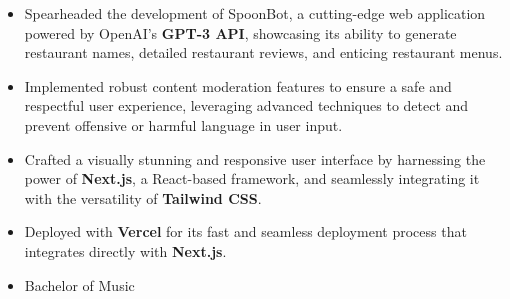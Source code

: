 \documentclass[9pt,a4paper,withhyper]{altacv}
\begin{document}
\begin{paracol}{2}
  \begin{itemize}
    \item Spearheaded the development of SpoonBot, a cutting-edge web application powered by OpenAI's \textbf{GPT-3 API}, showcasing its ability to generate restaurant names, detailed restaurant reviews, and enticing restaurant menus.
    \item Implemented robust content moderation features to ensure a safe and respectful user experience, leveraging advanced techniques to detect and prevent offensive or harmful language in user input.
    \item Crafted a visually stunning and responsive user interface by harnessing the power of \textbf{Next.js}, a React-based framework, and seamlessly integrating it with the versatility of \textbf{Tailwind CSS}.
    \item Deployed with \textbf{Vercel} for its fast and seamless deployment process that integrates directly with \textbf{Next.js}.
  \end{itemize}

  \switchcolumn

  \begin{itemize}
    \item Bachelor of Music
  \end{itemize}



\end{paracol}
\end{document}
